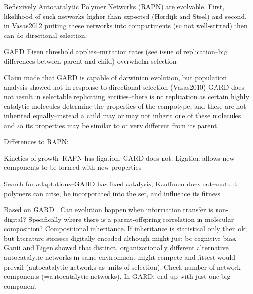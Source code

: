 \begin{NOTES}
\cite{Kauffman1986}
Reflexively Autocatalytic Polymer Networks (RAPN) are evolvable. First, likelihood of such networks higher than expected (Hordijk and Steel) and second, in Vasas2012 putting these networks into compartments (so not well-stirred) then can do directional selection.

GARD \parencite{Segre1998}
Eigen threshold applies--mutation rates (see issue of replication--big differences between parent and child) overwhelm selection \parencite{Vasas2015, Vasas2012, Vasas2012a}

Claim made that GARD is capable of darwinian evolution, but population analysis showed not in response to directional selection (Vasas2010) \parencite{Vasas2015, Vasas2012, Vasas2012a}
GARD does not result in selectable replicating entities--there is no replication as certain highly catalytic molecules determine the properties of the compotype, and these are not inherited equally--instead a child may or may not inherit one of these molecules and so its properties may be similar to or very different from its parent \parencite{Vasas2015, Vasas2012, Vasas2012a}

Differences to RAPN:
\begin{compactitem}
	\item Kinetics of growth--RAPN has ligation, GARD does not. Ligation allows new components to be formed with new properties
	\item Search for adaptations--GARD has fixed catalysis, Kauffman does not--mutant polymers can arise, be incorporated into the set, and influence its fitness
\end{compactitem}

\parencite{Vasas2015, Vasas2012, Vasas2012a}
Based on GARD \parencite{Segre1998}. Can evolution happen when information transfer is non-digital? Specifically where there is a parent-offspring correlation in molecular composition? Compositional inheritance. If inheritance is statistical only then ok; but literature stresses digitally encoded although might just be cognitive bias. Ganti and Eigen showed that distinct, organizationally different alternative autocatalytic networks in same environment might compete and fittest would prevail (\eg autocatalytic networks as units of selection).	Check number of network components (=autocatalytic networks). In GARD, end up with just one big component


\end{NOTES}
